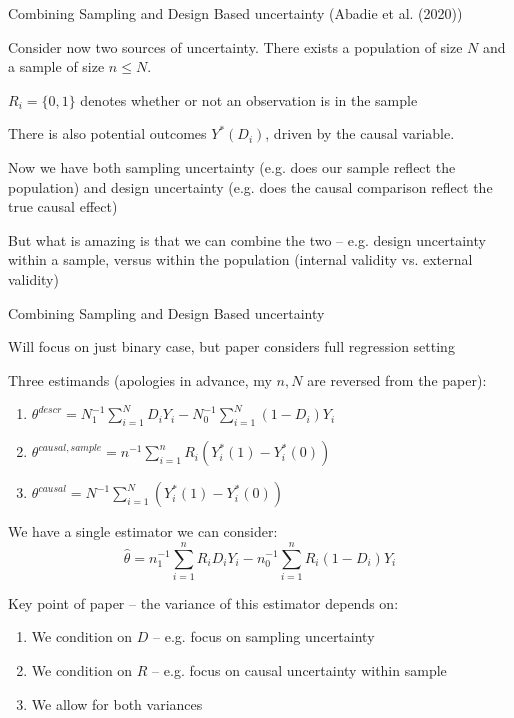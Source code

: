 \documentclass[notes,11pt, aspectratio=169]{beamer}
\newenvironment{wideitemize}{\itemize\addtolength{\itemsep}{10pt}}{\enditemize}
\begin{document}
\begin{frame}{Combining Sampling and Design Based uncertainty (Abadie et al. (2020))}
  \begin{wideitemize}
  \item Consider now two sources of uncertainty. There exists a population of size $N$ and a sample of size $n \leq N$.
  \item $R_{i} = \{0,1\}$ denotes whether or not an observation is in the sample
  \item There is also potential outcomes $Y^{*}(D_{i})$, driven by the
    causal variable.
  \item Now we have both sampling uncertainty (e.g. does our sample
    reflect the population) and design uncertainty (e.g. does the
    causal comparison reflect the true causal effect)
  \item But what is amazing is that we can combine the two --
    e.g. design uncertainty within a sample, versus within the
    population (internal validity vs. external validity)
  \end{wideitemize}
\end{frame}

\begin{frame}{Combining Sampling and Design Based uncertainty}
  \begin{wideitemize}
  \item   Will focus on just binary case, but paper considers full regression setting
  \item   Three estimands (apologies in advance, my $n,N$ are reversed from the paper):
  \begin{enumerate}
  \item $\theta^{descr} = N^{-1}_{1}\sum_{i=1}^{N}D_{i}Y_{i} - N^{-1}_{0}\sum_{i=1}^{N}(1-D_{i})Y_{i}$
  \item $\theta^{causal, sample} = n^{-1}\sum_{i=1}^{n}R_{i}(Y^{*}_{i}(1) - Y_{i}^{*}(0))$
  \item $\theta^{causal} = N^{-1}\sum_{i=1}^{N}(Y^{*}_{i}(1) - Y_{i}^{*}(0))$    
  \end{enumerate}
\item We have a single estimator we can consider:
  \begin{equation*}
    \hat{\theta} = n^{-1}_{1}\sum_{i=1}^{n}R_{i}D_{i}Y_{i} - n^{-1}_{0}\sum_{i=1}^{n}R_{i}(1-D_{i})Y_{i}
  \end{equation*}
\item Key point of paper -- the variance of this estimator depends on:
  \begin{enumerate}
  \item We condition on $D$ -- e.g. focus on sampling uncertainty
  \item We condition on $R$ -- e.g. focus on causal uncertainty within sample
  \item We allow for both variances
  \end{enumerate}
  \end{wideitemize}
\end{frame}
\end{document}
